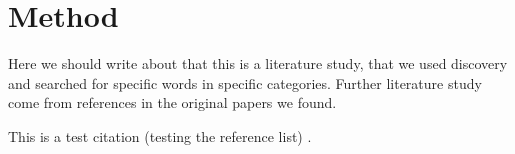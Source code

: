 \section{Method}
Here we should write about that this is a literature study, that we used discovery and searched for specific words in specific categories. Further literature study come from references in the original papers we found.

This is a test citation (testing the reference list) \cite{Lamport:LaTeX}.
